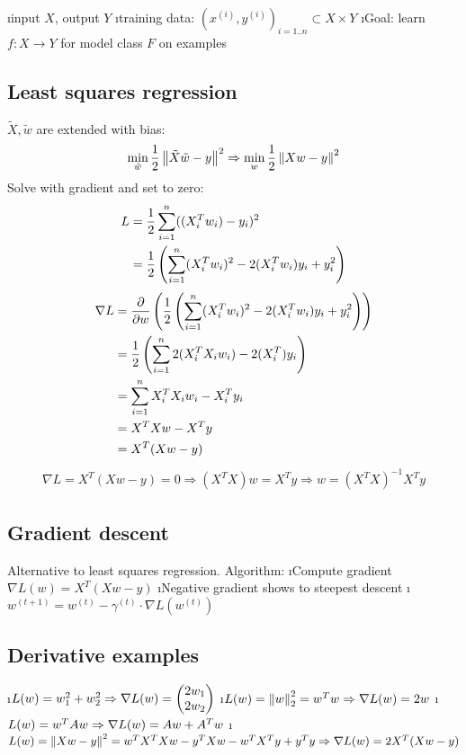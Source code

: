 
\bi
\i input $X$, output $Y$
\i training data: $(x^{(i)}, y^{(i)})_{i=1..n} \subset X \times Y$
\i Goal: learn $f: X \to Y$ for model class $F$ on examples
\ei

\subsection{Least squares regression}
$\tilde X, \tilde w$ are extended with bias:
\begin{align*}
\min_{\tilde w} \frac{1}{2} \left\lVert\tilde X \tilde w - y\right\rVert^2 \Rightarrow \min_w \frac{1}{2} \left\lVert Xw-y\right\rVert^2
\end{align*}
Solve with gradient and set to zero:
\begin{align*}
L &= \frac{1}{2} \displaystyle\sum_{i=1}^n ((X_i^Tw_i)-y_i)^2 \\
&= \frac{1}{2} \left(\displaystyle\sum_{i=1}^n (X_i^Tw_i)^2 - 2(X_i^Tw_i)y_i + y_i^2 \right) \\
\end{align*}
\begin{align*}
  \nabla L &= \frac{\partial}{\partial w} \left(  \frac{1}{2} \left(\displaystyle\sum_{i=1}^n (X_i^Tw_i)^2 - 2(X_i^Tw_i)y_i + y_i^2 \right) \right)\\
  &= \frac{1}{2} \left(\displaystyle\sum_{i=1}^n 2(X_i^TX_iw_i) - 2(X_i^T)y_i \right)\\
  &= \displaystyle\sum_{i=1}^n X_i^TX_iw_i - X_i^Ty_i\\
  &= X^TXw - X^Ty\\
  &= X^T(Xw-y)
\end{align*}
\begin{align*}
\nabla L = X^T(Xw-y) = 0 \Rightarrow (X^TX)w = X^Ty \Rightarrow w = (X^TX)^{-1}X^Ty
\end{align*}

\subsection{Gradient descent}
Alternative to least squares regression. Algorithm:
\be
\i Compute gradient $\nabla L(w) = X^T(Xw-y)$
\i Negative gradient shows to steepest descent
\i $w^{(t+1)} = w^{(t)} - \gamma^{(t)} \cdot \nabla L(w^{(t)})$
\ee

\subsection{Derivative examples}

\bi
\i $L(w) = w_1^2 + w_2^2 \\\Rightarrow \nabla L(w) = \begin{pmatrix} 2w_1\\2w_2 \end{pmatrix}$
\i $L(w) = \left\lVert w\right\rVert ^2_2 = w^Tw \\\Rightarrow \nabla L(w) = 2w$
\i $L(w) = w^TAw \\\Rightarrow \nabla L(w) = Aw + A^Tw$
\i $L(w) = \left\lVert Xw-y\right\rVert^2 = w^TX^TXw - y^TXw - w^TX^Ty + y^Ty \\\Rightarrow \nabla L(w) = 2X^T(Xw - y)$
\ei

